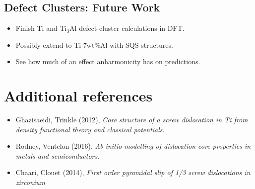 \documentclass[11pt]{article}
\begin{document}
\subsection*{Defect Clusters: Future Work}
\label{sec:org0fbc256}
\begin{itemize}
\item Finish Ti and \(\text{Ti}_{3}\text{Al}\) defect cluster calculations in DFT.
\item Possibly extend to Ti-7wt\%Al with SQS structures.
\item See how much of an effect anharmonicity has on predictions.
\end{itemize}


\section*{Additional references}
\label{sec:org9f283fe}

\begin{itemize}
\item Ghazisaeidi, Trinkle (2012), \emph{Core structure of a screw dislocation in Ti from density functional theory and classical potentials}.
\item Rodney, Ventelon (2016), \emph{Ab initio modelling of dislocation core properties
in metals and semiconductors}.
\item Chaari, Clouet (2014), \emph{First order pyramidal slip of 1/3 screw dislocations in zirconium}
\end{itemize}
\end{document}
